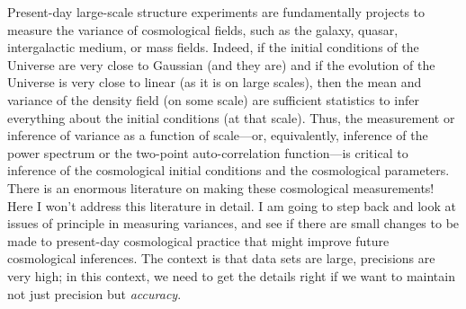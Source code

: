 \documentclass[12pt, letterpaper, preprint]{aastex}
\begin{document}
Present-day large-scale structure experiments are fundamentally
projects to measure the variance of cosmological fields, such as the
galaxy, quasar, intergalactic medium, or mass fields.
Indeed, if the initial conditions of the Universe are very close to
Gaussian (and they are) and if the evolution of the Universe is very
close to linear (as it is on large scales), then the mean and variance
of the density field (on some scale) are sufficient statistics to
infer everything about the initial conditions (at that scale).
Thus, the measurement or inference of variance as a function of
scale---or, equivalently, inference of the power spectrum or the
two-point auto-correlation function---is critical to inference of the
cosmological initial conditions and the cosmological parameters.
There is an enormous literature on making these cosmological
measurements!
Here I won't address this literature in detail.
I am going to step back and look at issues of principle in measuring
variances, and see if there are small changes to be made to
present-day cosmological practice that might improve future cosmological
inferences.
The context is that data sets are large, precisions are very high;
in this context, we need to get the details right if we want to maintain
not just precision but \emph{accuracy}.
\end{document}
